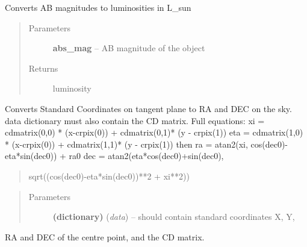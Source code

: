 \documentclass[letterpaper,10pt,english]{sphinxmanual}
\begin{document}

\begin{fulllineitems}
\label{SamPy.astronomy:SamPy.astronomy.conversions.Luminosity}
Converts AB magnitudes to luminosities in L\_sun
\begin{quote}\begin{description}
\item[{Parameters}] \leavevmode
\textbf{abs\_mag} -- AB magnitude of the object

\item[{Returns}] \leavevmode
luminosity

\end{description}\end{quote}

\end{fulllineitems}



\begin{fulllineitems}
\label{SamPy.astronomy:SamPy.astronomy.conversions.RAandDECfromStandardCoordinates}
Converts Standard Coordinates on tangent plane
to RA and DEC on the sky.
data dictionary must also contain the CD matrix.
Full equations:
xi  = cdmatrix(0,0) * (x-crpix(0)) + cdmatrix(0,1)* (y - crpix(1))
eta = cdmatrix(1,0) * (x-crpix(0)) + cdmatrix(1,1)* (y - crpix(1))
then
ra = atan2(xi, cos(dec0)-eta*sin(dec0)) + ra0
dec = atan2(eta*cos(dec0)+sin(dec0),
\begin{quote}

sqrt((cos(dec0)-eta*sin(dec0))**2 + xi**2))
\end{quote}
\begin{quote}\begin{description}
\item[{Parameters}] \leavevmode
\textbf{(dictionary)} (\emph{data}) -- should contain standard coordinates X, Y,

\end{description}\end{quote}

RA and DEC of the centre point, and the CD matrix.

\end{fulllineitems}
\end{document}
